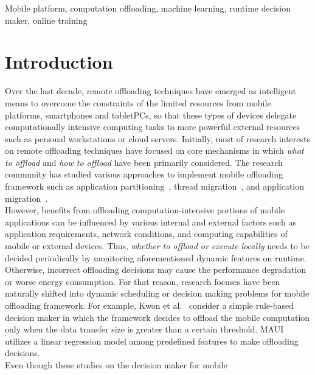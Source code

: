 \documentclass[10pt, conference, compsocconf]{IEEEtran}
\begin{document}
\begin{IEEEkeywords}
Mobile platform, computation offloading, machine learning, runtime
decision maker, online training
\end{IEEEkeywords}

\section{Introduction}
%
Over the last decade, remote offloading techniques have emerged as
intelligent means to overcome the constraints of the limited resources
from mobile platforms, smartphones and tabletPCs, so that these types of
devices delegate computationally intensive computing tasks to more
powerful external resources such as personal workstations or cloud
servers.
%
Initially, most of research interests on remote offloading techniques
have focused on core mechanisms in which \textit{what to offload} and
\textit{how to offload} have been primarily considered. 
%
The research community has studied various approaches to implement mobile
offloading framework such as application partitioning~\cite{spectra,
maui, cuckoo}, thread migration~\cite{clonecloud, comet}, and
application migration~\cite{hung}.\\
%
\indent However, benefits from offloading computation-intensive portions
of mobile applications can be influenced by various internal and
external factors such as application requirements, network conditions,
and computing capabilities of mobile or external devices.
%
Thus, \textit{whether to offload or execute locally} needs to be
decided periodically by monitoring aforementioned dynamic features on
runtime.
%
Otherwise, incorrect offloading decisions may cause the performance
degradation or worse energy consumption.
%
For that reason, research focuses have been naturally shifted into
dynamic scheduling or decision making problems for mobile offloading
framework.
%
For example, Kwon et al.~\cite{kwon} consider a simple rule-based
decision maker in which the framework decides to offload the mobile
computation only when the data transfer size is greater than a certain
threshold.
%
MAUI~\cite{maui} utilizes a linear regression model among predefined
features to make offloading decisions.\\
%
%
\indent Even though these studies on the decision maker for mobile
\end{document}
